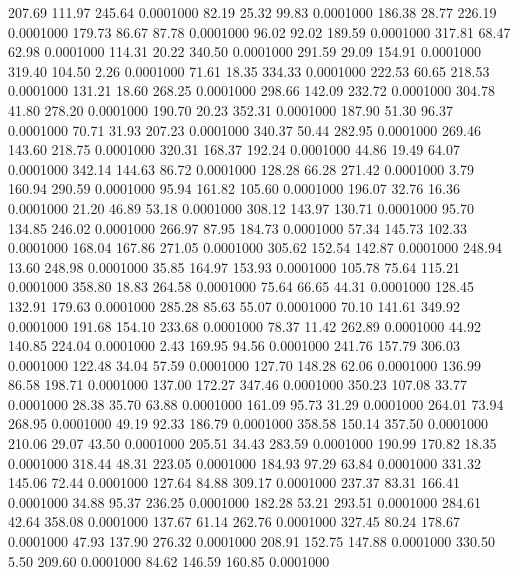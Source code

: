  207.69  111.97  245.64   0.0001000
  82.19   25.32   99.83   0.0001000
 186.38   28.77  226.19   0.0001000
 179.73   86.67   87.78   0.0001000
  96.02   92.02  189.59   0.0001000
 317.81   68.47   62.98   0.0001000
 114.31   20.22  340.50   0.0001000
 291.59   29.09  154.91   0.0001000
 319.40  104.50    2.26   0.0001000
  71.61   18.35  334.33   0.0001000
 222.53   60.65  218.53   0.0001000
 131.21   18.60  268.25   0.0001000
 298.66  142.09  232.72   0.0001000
 304.78   41.80  278.20   0.0001000
 190.70   20.23  352.31   0.0001000
 187.90   51.30   96.37   0.0001000
  70.71   31.93  207.23   0.0001000
 340.37   50.44  282.95   0.0001000
 269.46  143.60  218.75   0.0001000
 320.31  168.37  192.24   0.0001000
  44.86   19.49   64.07   0.0001000
 342.14  144.63   86.72   0.0001000
 128.28   66.28  271.42   0.0001000
   3.79  160.94  290.59   0.0001000
  95.94  161.82  105.60   0.0001000
 196.07   32.76   16.36   0.0001000
  21.20   46.89   53.18   0.0001000
 308.12  143.97  130.71   0.0001000
  95.70  134.85  246.02   0.0001000
 266.97   87.95  184.73   0.0001000
  57.34  145.73  102.33   0.0001000
 168.04  167.86  271.05   0.0001000
 305.62  152.54  142.87   0.0001000
 248.94   13.60  248.98   0.0001000
  35.85  164.97  153.93   0.0001000
 105.78   75.64  115.21   0.0001000
 358.80   18.83  264.58   0.0001000
  75.64   66.65   44.31   0.0001000
 128.45  132.91  179.63   0.0001000
 285.28   85.63   55.07   0.0001000
  70.10  141.61  349.92   0.0001000
 191.68  154.10  233.68   0.0001000
  78.37   11.42  262.89   0.0001000
  44.92  140.85  224.04   0.0001000
   2.43  169.95   94.56   0.0001000
 241.76  157.79  306.03   0.0001000
 122.48   34.04   57.59   0.0001000
 127.70  148.28   62.06   0.0001000
 136.99   86.58  198.71   0.0001000
 137.00  172.27  347.46   0.0001000
 350.23  107.08   33.77   0.0001000
  28.38   35.70   63.88   0.0001000
 161.09   95.73   31.29   0.0001000
 264.01   73.94  268.95   0.0001000
  49.19   92.33  186.79   0.0001000
 358.58  150.14  357.50   0.0001000
 210.06   29.07   43.50   0.0001000
 205.51   34.43  283.59   0.0001000
 190.99  170.82   18.35   0.0001000
 318.44   48.31  223.05   0.0001000
 184.93   97.29   63.84   0.0001000
 331.32  145.06   72.44   0.0001000
 127.64   84.88  309.17   0.0001000
 237.37   83.31  166.41   0.0001000
  34.88   95.37  236.25   0.0001000
 182.28   53.21  293.51   0.0001000
 284.61   42.64  358.08   0.0001000
 137.67   61.14  262.76   0.0001000
 327.45   80.24  178.67   0.0001000
  47.93  137.90  276.32   0.0001000
 208.91  152.75  147.88   0.0001000
 330.50    5.50  209.60   0.0001000
  84.62  146.59  160.85   0.0001000
